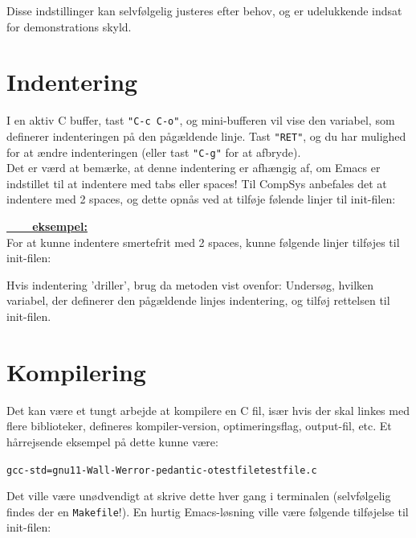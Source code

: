 \documentclass[a4paper, 9pt]{article}
\newcommand{\key}[1]{\texttt{"#1"}}
\newcommand{\example}[1]{\vspace{3mm}\noindent\textbf{\underline{\ \ \ \ #1}}\vspace{2mm}\\}
\newcommand{\lstline}{\vspace{-3mm}\hrulefill\vspace{2mm}\newline}
\newcommand{\customlisting}[3]{\lstline}
\begin{document}
\customlisting{ELisp}{init.el}{setup-backups.el}

\noindent Disse indstillinger kan selvfølgelig justeres efter behov, og er udelukkende indsat for demonstrations skyld.


\newpage
\section{Indentering}
I en aktiv C buffer, tast \key{C-c C-o}, og mini-bufferen vil vise den variabel, som definerer indenteringen på den pågældende linje. Tast \key{RET}, og du har mulighed for at ændre indenteringen (eller tast \key{C-g} for at afbryde).\\

Det er værd at bemærke, at denne indentering er afhængig af, om Emacs er indstillet til at indentere med tabs eller spaces! Til CompSys anbefales det at indentere med 2 spaces, og dette opnås ved at tilføje følende linjer til init-filen:

\customlisting{ELisp}{init.el}{fix-your-indentation.el}

\example{eksempel:}
For at kunne indentere smertefrit med 2 spaces, kunne følgende linjer tilføjes til init-filen:

\customlisting{ELisp}{init.el}{indentation-style.el}

\noindent
Hvis indentering 'driller', brug da metoden vist ovenfor: Undersøg, hvilken variabel, der definerer den pågældende linjes indentering, og tilføj rettelsen til init-filen.


\newpage
\section{Kompilering}
Det kan være et tungt arbejde at kompilere en C fil, især hvis der skal linkes med flere biblioteker, defineres kompiler-version, optimeringsflag, output-fil, etc. Et hårrejsende eksempel på dette kunne være:
\vspace{2mm}\begin{alltt}\footnotesize\centering
gcc -std=gnu11 -Wall -Werror -pedantic -o testfile testfile.c
\end{alltt}\vspace{4mm}

\noindent
Det ville være unødvendigt at skrive dette hver gang i terminalen (selvfølgelig findes der en \texttt{Makefile}!). En hurtig Emacs-løsning ville være følgende tilføjelse til init-filen:

\customlisting{ELisp}{init.el}{my-compile-function.el}
\end{document}
